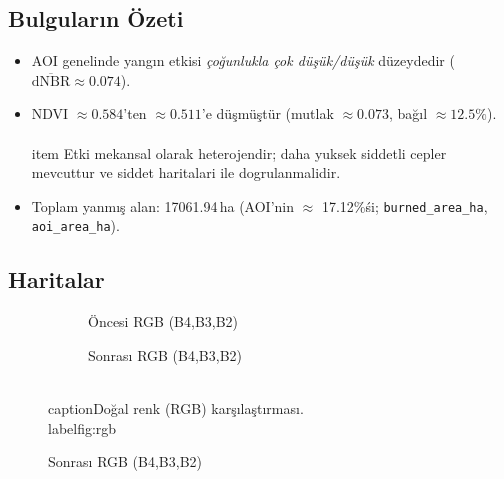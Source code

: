 \documentclass[11pt,a4paper]{article}
\begin{document}
\subsection{Bulguların Özeti}
\begin{itemize}
  \item AOI genelinde yangın etkisi \emph{çoğunlukla çok düşük/düşük} düzeydedir (\(\overline{\mathrm{dNBR}} \approx 0.074\)).
  \item NDVI \(\approx0.584\)'ten \(\approx0.511\)'e düşmüştür (mutlak \(\approx0.073\), bağıl \(\approx12.5\%\)).
  \\\\item Etki mekansal olarak heterojendir; daha yuksek siddetli cepler mevcuttur ve siddet haritalari ile dogrulanmalidir.
  \item Toplam yanmış alan: \num{17061.94}\,ha (AOI'nin \(\approx\) \num{17.12}\%\'si; \texttt{burned\_area\_ha}, \texttt{aoi\_area\_ha}).
\end{itemize}
\subsection{Haritalar}
\begin{figure}[H]
  \centering
  \begin{subfigure}[b]{0.48\textwidth}
    \centering
    \caption{Öncesi RGB (B4,B3,B2)}
  \end{subfigure}\hfill
  \begin{subfigure}[b]{0.48\textwidth}
    \centering
    \caption{Sonrası RGB (B4,B3,B2)}
  \end{subfigure}
  \\caption{Doğal renk (RGB) karşılaştırması.}
  \\label{fig:rgb}
\end{figure}
\FloatBarrier
\end{document}
